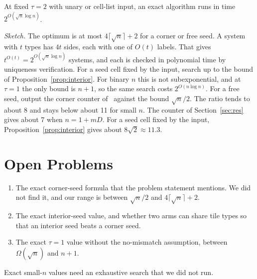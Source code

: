 \documentclass[10pt]{hackr26}
\begin{document}
\begin{prop}\label{prop:alg}
At fixed $\tau=2$ with unary or cell-list input, an exact algorithm runs in time $2^{O(\sqrt n\log n)}$.
\end{prop}
\noindent\emph{Sketch.}
The optimum is at most $4\lceil\sqrt n\rceil+2$ for a corner or free seed.
A system with $t$ types has $4t$ sides, each with one of $O(t)$ labels.
That gives $t^{O(t)}=2^{O(\sqrt n\log n)}$ systems, and each is checked in polynomial time by uniqueness verification.
For a seed cell fixed by the input, search up to the bound of Proposition~\ref{prop:interior}.
For binary $n$ this is not subexponential, and at $\tau=1$ the only bound is $n+1$, so the same search costs $2^{O(n\log n)}$.
For a free seed, output the corner counter of~\cite{ACG05} against the bound $\sqrt n/2$.
The ratio tends to about 8 and stays below about 11 for small $n$.
The counter of Section~\ref{sec:res} gives about 7 when $n=1+mD$.
For a seed cell fixed by the input, Proposition~\ref{prop:interior} gives about $8\sqrt2\approx11.3$.

\section{Open Problems} \label{sec:open}

\begin{enumerate}
  \item The exact corner-seed formula that the problem statement mentions.
  We did not find it, and our range is between $\sqrt n/2$ and $4\lceil\sqrt n\rceil+2$.
  \item The exact interior-seed value, and whether two arms can share tile types so that an interior seed beats a corner seed.
  \item The exact $\tau=1$ value without the no-mismatch assumption, between $\Omega(\sqrt n)$ and $n+1$.
\end{enumerate}
Exact small-$n$ values need an exhaustive search that we did not run.

\end{document}
